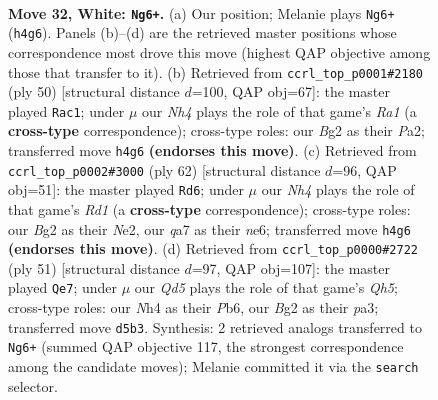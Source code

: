 \documentclass[11pt]{article}
\begin{document}
\clearpage

\begin{figure}[p]\centering
\begin{subfigure}{0.46\textwidth}\centering
\resizebox{\linewidth}{!}{%
\newchessgame
\chessboard[
  setfen={r2n1k2/qp4p1/p4p2/3Q2np/7N/4P1P1/PP2RPBP/1R4K1 w - - 0 32},
  showmover=false,
  pgfstyle=straightmove, color=movearrow, markmove={h4-g6}
]}
\caption{}
\end{subfigure}\hfill
\begin{subfigure}{0.46\textwidth}\centering
\resizebox{\linewidth}{!}{%
\newchessgame
\chessboard[
  setfen={r5k1/3n1ppp/q3p3/p1pr4/Q7/1P3NP1/P1R1PP1P/R5K1 w - - 10 26},
  showmover=false,
  pgfstyle=straightmove, color=movearrow, markmove={a1-c1}
]}
\caption{}
\end{subfigure}
\\[4pt]
\begin{subfigure}{0.46\textwidth}\centering
\resizebox{\linewidth}{!}{%
\newchessgame
\chessboard[
  setfen={4r1k1/1b4pp/4nq2/p1p1n3/P3P3/5PQ1/1PR1N1PP/3R3K w - - 4 32},
  showmover=false,
  pgfstyle=straightmove, color=movearrow, markmove={d1-d6}
]}
\caption{}
\end{subfigure}\hfill
\begin{subfigure}{0.46\textwidth}\centering
\resizebox{\linewidth}{!}{%
\newchessgame
\chessboard[
  setfen={4r1k1/p4p2/1pr3pp/2p1n3/4N2q/P1Q1PP2/1P4PP/1K1R3R b - - 1 26},
  showmover=false,
  pgfstyle=straightmove, color=movearrow, markmove={h4-e7}
]}
\caption{}
\end{subfigure}
\caption{\textbf{Move 32, White: \texttt{Ng6+}.} (a) Our position; Melanie plays \texttt{Ng6+} (\texttt{h4g6}). Panels (b)--(d) are the retrieved master positions whose correspondence most drove this move (highest QAP objective among those that transfer to it). (b) Retrieved from \texttt{ccrl\_top\_p0001\#2180} (ply 50) [structural distance $d$=100, QAP obj=67]: the master played \texttt{Rac1}; under $\mu$ our \emph{Nh4} plays the role of that game's \emph{Ra1} (a \textbf{cross-type} correspondence); cross-type roles: our \emph{B}g2 as their \emph{P}a2; transferred move \texttt{h4g6} \textbf{(endorses this move)}. (c) Retrieved from \texttt{ccrl\_top\_p0002\#3000} (ply 62) [structural distance $d$=96, QAP obj=51]: the master played \texttt{Rd6}; under $\mu$ our \emph{Nh4} plays the role of that game's \emph{Rd1} (a \textbf{cross-type} correspondence); cross-type roles: our \emph{B}g2 as their \emph{N}e2, our \emph{q}a7 as their \emph{n}e6; transferred move \texttt{h4g6} \textbf{(endorses this move)}. (d) Retrieved from \texttt{ccrl\_top\_p0000\#2722} (ply 51) [structural distance $d$=97, QAP obj=107]: the master played \texttt{Qe7}; under $\mu$ our \emph{Qd5} plays the role of that game's \emph{Qh5}; cross-type roles: our \emph{N}h4 as their \emph{P}b6, our \emph{B}g2 as their \emph{p}a3; transferred move \texttt{d5b3}. Synthesis: 2 retrieved analogs transferred to \texttt{Ng6+} (summed QAP objective 117, the strongest correspondence among the candidate moves); Melanie committed it via the \texttt{search} selector.}
\label{fig:thought-m62}
\end{figure}
\end{document}
